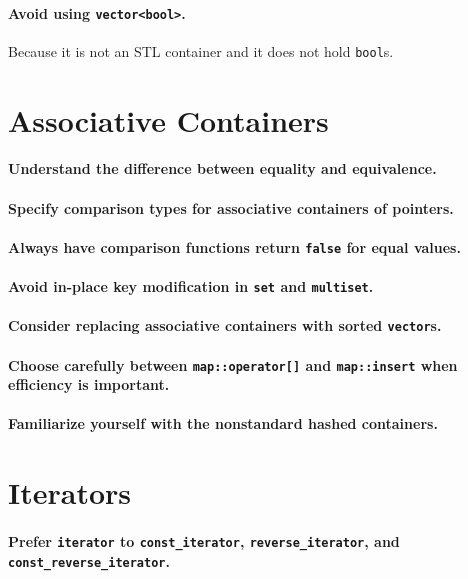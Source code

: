 \documentclass{article}
\begin{document}
\paragraph{Avoid using {\tt vector<bool>}.} Because it is not an STL container
and it does not hold {\tt bool}s.

\section{Associative Containers}

\paragraph{Understand the difference between equality and equivalence.}
\paragraph{Specify comparison types for associative containers of pointers.}
\paragraph{Always have comparison functions return {\tt false} for equal values.}
\paragraph{Avoid in-place key modification in {\tt set} and {\tt multiset}.}
\paragraph{Consider replacing associative containers with sorted {\tt vector}s.}
\paragraph{Choose carefully between {\tt map::operator[]} and {\tt map::insert} when efficiency is important.}
\paragraph{Familiarize yourself with the nonstandard hashed containers.}

\section{Iterators}

\paragraph{Prefer {\tt iterator} to {\tt const\_iterator}, {\tt reverse\_iterator}, and {\tt const\_reverse\_iterator}.}
\end{document}
